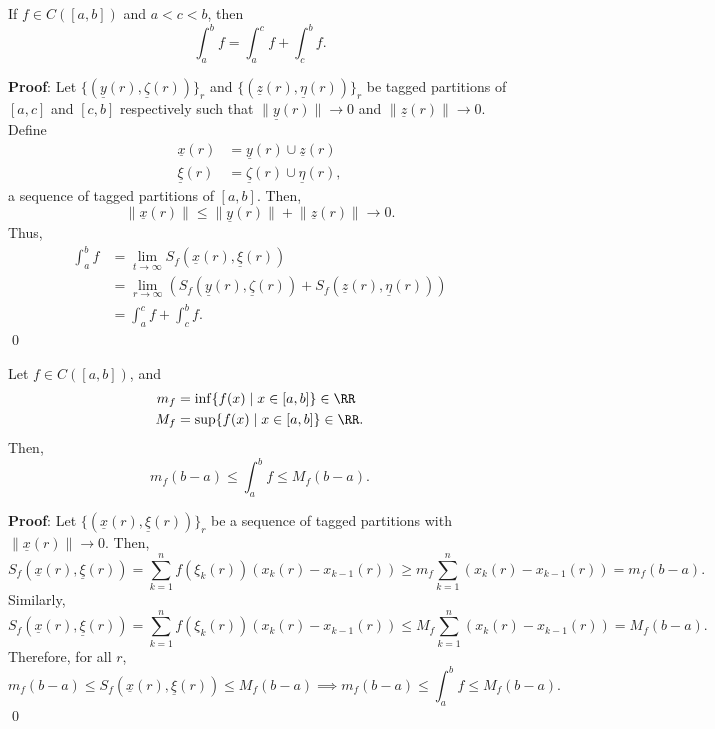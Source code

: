 \begin{theorem}[Additivity]
If $f\in C([a,b])$ and $a<c<b$, then 
\[
\int_a^b f = \int_a^c f + \int_c^b f.
\]
\end{theorem}
\textbf{Proof}: Let $\{(\underline{y}(r), \underline{\zeta}(r))\}_r$ and $\{(\underline{z}(r), \underline{\eta}(r))\}_r$ be tagged partitions of $[a,c]$ and $[c,b]$ respectively such that $\lVert \underline{y}(r)\rVert \to 0$ and $\lVert \underline{z}(r)\rVert \to 0$. Define 
\begin{align*}
    \underline{x}(r) &= \underline{y}(r) \cup \underline{z}(r) \\
    \underline{\xi}(r) &= \underline{\zeta}(r) \cup \underline{\eta}(r),
\end{align*}
a sequence of tagged partitions of $[a,b]$. Then,
\[
\lVert \underline{x}(r)\rVert \leq \lVert \underline{y}(r)\rVert + \lVert \underline{z}(r)\rVert \to 0.
\]
Thus, 
\begin{align*}
    \int_a^b f &= \lim_{t\to \infty} S_f(\underline{x}(r), \underline{\xi}(r)) \\
    &= \lim_{r\to \infty} (S_f(\underline{y}(r), \underline{\zeta}(r)) + S_f(\underline{z}(r), \underline{\eta}(r))) \\
    &= \int_a^c f + \int_c^b f.
\end{align*}\qed 

\begin{theorem}
Let $f\in C([a,b])$, and
\begin{align*}
    m_f &= \inf\{f(x) \mid x\in [a,b]\} \in \RR\\
    M_f &= \sup \{f(x) \mid x\in [a,b]\}\in \RR.
\end{align*}
Then, 
\[
m_f(b-a) \leq \int_a^b f \leq M_f(b-a).
\]
\end{theorem}
\textbf{Proof}: Let $\{(\underline{x}(r), \underline{\xi}(r))\}_r$ be a sequence of tagged partitions with $\lVert \underline{x}(r)\rVert \to 0$. Then, 
\[
S_f(\underline{x}(r), \underline{\xi}(r)) = \sum_{k=1}^n f(\xi_k(r))(x_k(r)-x_{k-1}(r))\geq m_f \sum_{k=1}^n (x_k(r)- x_{k-1}(r)) = m_f(b-a).
\]
Similarly, 
\[
S_f(\underline{x}(r), \underline{\xi}(r)) = \sum_{k=1}^n f(\xi_k(r))(x_k(r)-x_{k-1}(r))\leq M_f \sum_{k=1}^n (x_k(r)- x_{k-1}(r)) = M_f(b-a).
\]
Therefore, for all $r$,
\[
m_f(b-a) \leq S_f(\underline{x}(r), \underline{\xi}(r)) \leq M_f(b-a) \implies m_f(b-a) \leq \int_a^b f \leq M_f(b-a).
\]\qed 

